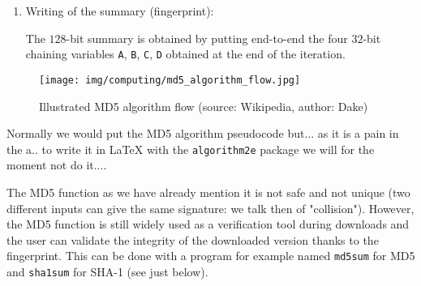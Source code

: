 \begin{enumerate}
		\item Writing of the summary (fingerprint):
		
		The $128$-bit summary is obtained by putting end-to-end the four $32$-bit chaining variables \texttt{A}, \texttt{B}, \texttt{C}, \texttt{D} obtained at the end of the iteration.
	\end{enumerate}
	\begin{figure}[H]
		\centering
		\texttt{[image: img/computing/md5\_algorithm\_flow.jpg]}
		\caption{Illustrated MD5 algorithm flow (source: Wikipedia, author: Dake)}
	\end{figure}
	\begin{tcolorbox}[title=Remark,colframe=black,arc=10pt]
	Normally we would put the MD5 algorithm pseudocode but... as it is a pain in the a.. to write it in LaTeX with the \texttt{algorithm2e} package we will for the moment not do it....
	\end{tcolorbox}
	The MD5 function as we have already mention it is not safe and not unique (two different inputs can give the same signature: we talk then of "collision"). However, the MD5 function is still widely used as a verification tool during downloads and the user can validate the integrity of the downloaded version thanks to the fingerprint. This can be done with a program for example named \texttt{md5sum} for MD5 and \texttt{sha1sum} for SHA-1 (see just below).
	
